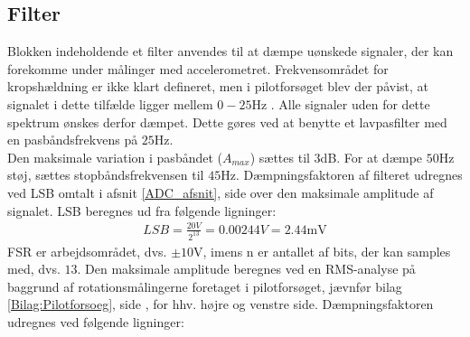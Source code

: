 \subsection{Filter}\label{FilterAfs}
Blokken indeholdende et filter anvendes til at dæmpe uønskede signaler, der kan forekomme under målinger med accelerometret. Frekvensområdet for kropshældning er ikke klart defineret, men i pilotforsøget blev der påvist, at signalet i dette tilfælde ligger mellem $0-25$Hz \cite{Martinez-Mendez2011}. Alle signaler uden for dette spektrum ønskes derfor dæmpet. Dette gøres ved at benytte et lavpasfilter med en pasbåndsfrekvens på $25$Hz. \\
Den maksimale variation i pasbåndet ($A_{max}$) sættes til $3$dB. For at dæmpe $50$Hz støj, sættes stopbåndsfrekvensen til $45$Hz. Dæmpningsfaktoren af filteret udregnes ved LSB omtalt i afsnit \ref{ADC_afsnit}, side \pageref{ADC_afsnit} over den maksimale amplitude af signalet. LSB beregnes ud fra følgende ligninger: \\
\begin{align}
	LSB = \frac{20V}{2^{13}} = 0.00244V = 2.44\text{mV}
\end{align}
FSR er arbejdsområdet, dvs. $\pm10$V, imens n er antallet af bits, der kan samples med, dvs. $13$. Den maksimale amplitude beregnes ved en RMS-analyse på baggrund af rotationsmålingerne foretaget i pilotforsøget, jævnfør bilag \ref{Bilag:Pilotforsoeg}, side \pageref{Bilag:Pilotforsoeg}, for hhv. højre og venstre side. Dæmpningsfaktoren udregnes ved følgende ligninger:

